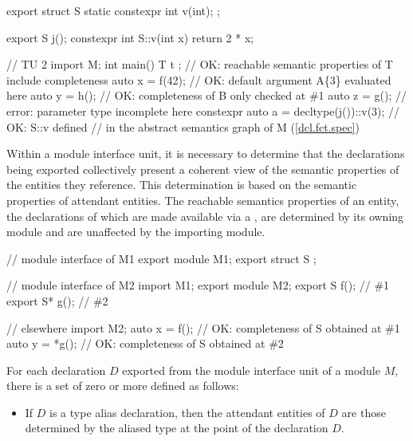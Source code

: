 \begin{std.txt}
\begin{example}
\begin{after}
\begin{codeblock}
export struct S {
  static constexpr int v(int);
};

export S j();
constexpr int S::v(int x) { return 2 * x; }

// TU 2
import M;
int main() {
  T t { };                // OK: reachable semantic properties of T include completeness
  auto x = f(42);         // OK: default argument A\{3\} evaluated here
  auto y = h();           // OK: completeness of B only checked at \#1
  auto z = g();           // error: parameter type incomplete here
  constexpr auto a = decltype(j())::v(3); // OK: S::v defined 
                          // in the abstract semantics graph of M (\ref{dcl.fct.spec})
}
\end{codeblock}
\end{after}
  \end{example}
  \exitnote

\begin{before}\color{addclr}
  \alinea
  Within a module interface unit, it is necessary to determine that the
  declarations being exported collectively present a coherent view of 
  the semantic properties of the entities they reference.  This determination
  is based on the semantic properties of attendant entities.
  \enternote
  The reachable semantics properties of an entity, the declarations of which
  are made available via a , are
  determined by its owning module and are unaffected by the importing module.
\end{before}\begin{before}\color{addclr}
  \begin{example}
    \begin{codeblock}
      // module interface of M1
      export module M1;
      export struct S { };

      // module interface of M2
      import M1;
      export module M2;
      export S f();       // \#1
      export S* g();      // \#2

      // elsewhere
      import M2;
      auto x = f();       // OK: completeness of S obtained at \#1
      auto y = *g();      // OK: completeness of S obtained at \#2
    \end{codeblock}
  \end{example}
  \exitnote
\end{before}\begin{before}\color{addclr}
  For each declaration $D$ exported from the module interface unit of a module $M$,
   there is a set of zero or more
   defined as follows:
  \begin{itemize}
    \item If $D$ is a type alias declaration, then the attendant entities
    of $D$ are those determined by the aliased type at the point of the 
    declaration $D$.


\end{itemize}
\end{before}
\end{std.txt}

